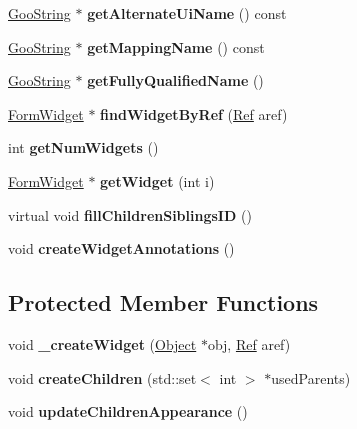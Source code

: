 \begin{DoxyCompactItemize}
\item 
\mbox{\label{class_form_field_a36ea9ca31fad60f4e7991daa2e180e65}} 
\hyperlink{class_goo_string}{Goo\+String} $\ast$ {\bfseries get\+Alternate\+Ui\+Name} () const
\item 
\mbox{\label{class_form_field_a02bf49cb198f7d8a6bbb7cb27de1ddf3}} 
\hyperlink{class_goo_string}{Goo\+String} $\ast$ {\bfseries get\+Mapping\+Name} () const
\item 
\mbox{\label{class_form_field_a59cd0aa99df6b51465ec208fd2160728}} 
\hyperlink{class_goo_string}{Goo\+String} $\ast$ {\bfseries get\+Fully\+Qualified\+Name} ()
\item 
\mbox{\label{class_form_field_aabf270dcf0c5fbc83c5471f2de367721}} 
\hyperlink{class_form_widget}{Form\+Widget} $\ast$ {\bfseries find\+Widget\+By\+Ref} (\hyperlink{struct_ref}{Ref} aref)
\item 
\mbox{\label{class_form_field_a590d9b89ef6d14b721f65631b1329145}} 
int {\bfseries get\+Num\+Widgets} ()
\item 
\mbox{\label{class_form_field_a7f8177971e85b66d38143f41a0e7a5a8}} 
\hyperlink{class_form_widget}{Form\+Widget} $\ast$ {\bfseries get\+Widget} (int i)
\item 
\mbox{\label{class_form_field_a6d140805d5a385586473b1619a1ff2b0}} 
virtual void {\bfseries fill\+Children\+Siblings\+ID} ()
\item 
\mbox{\label{class_form_field_a8cc50f87146fa6475721e225aeb88930}} 
void {\bfseries create\+Widget\+Annotations} ()
\end{DoxyCompactItemize}
\subsection*{Protected Member Functions}
\begin{DoxyCompactItemize}
\item 
\mbox{\label{class_form_field_a3a7da2aaaca69deecc30213635adf286}} 
void {\bfseries \+\_\+create\+Widget} (\hyperlink{class_object}{Object} $\ast$obj, \hyperlink{struct_ref}{Ref} aref)
\item 
\mbox{\label{class_form_field_a02415511cef8d0486300220368596589}} 
void {\bfseries create\+Children} (std\+::set$<$ int $>$ $\ast$used\+Parents)
\item 
\mbox{\label{class_form_field_a297c499f71fcad3d3648c9d4d0d540dc}} 
void {\bfseries update\+Children\+Appearance} ()
\end{DoxyCompactItemize}
